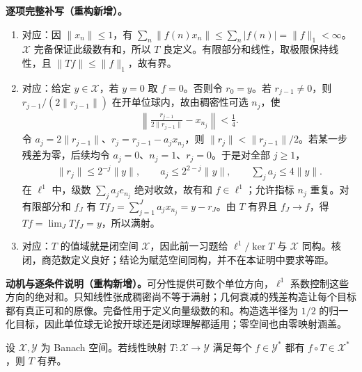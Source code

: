 \documentclass[../../main.tex]{subfiles}
\begin{document}
\begin{solution}
\textbf{逐项完整补写（重构新增）。}
\begin{enumerate}
\item 对应：因 $\|x_n\|\le1$，有 $\sum_n\|f(n)x_n\|\le\sum_n|f(n)|=\|f\|_1<\infty$。$\mathcal X$ 完备保证此级数有和，所以 $T$ 良定义。有限部分和线性，取极限保持线性，且 $\|Tf\|\le\|f\|_1$，故有界。
\item 对应：给定 $y\in\mathcal X$，若 $y=0$ 取 $f=0$。否则令 $r_0=y$。若 $r_{j-1}\ne0$，则 $r_{j-1}/(2\|r_{j-1}\|)$ 在开单位球内，故由稠密性可选 $n_j$，使
\begin{align*}
\left\|\frac{r_{j-1}}{2\|r_{j-1}\|}-x_{n_j}\right\|<\tfrac14.
\end{align*}
令 $a_j=2\|r_{j-1}\|$、$r_j=r_{j-1}-a_jx_{n_j}$，则 $\|r_j\|<\|r_{j-1}\|/2$。若某一步残差为零，后续均令 $a_j=0$、$n_j=1$、$r_j=0$。于是对全部 $j\ge1$，
\begin{align*}
\|r_j\|\le2^{-j}\|y\|,\qquad a_j\le2^{2-j}\|y\|,\qquad \sum_ja_j\le4\|y\|.
\end{align*}
在 $\ell^1$ 中，级数 $\sum_ja_je_{n_j}$ 绝对收敛，故有和 $f\in\ell^1$；允许指标 $n_j$ 重复。对有限部分和 $f_J$ 有 $Tf_J=\sum_{j=1}^Ja_jx_{n_j}=y-r_J$。由 $T$ 有界且 $f_J\to f$，得 $Tf=\lim_JTf_J=y$，所以满射。
\item 对应：$T$ 的值域就是闭空间 $\mathcal X$，因此前一习题给 $\ell^1/\ker T$ 与 $\mathcal X$ 同构。核闭，商范数定义良好；结论为赋范空间同构，并不在本证明中要求等距。
\end{enumerate}
\end{solution}
\begin{remark}
\textbf{动机与逐条件说明（重构新增）。}可分性提供可数个单位方向，$\ell^1$ 系数控制这些方向的绝对和。只知线性张成稠密尚不等于满射；几何衰减的残差构造让每个目标都有真正可和的原像。完备性用于定义向量级数的和。构造选半径为 $1/2$ 的归一化目标，因此单位球无论按开球还是闭球理解都适用；零空间也由零映射涵盖。
\end{remark}
\begin{exercise}\label{exercise:ch05-weak-tests-bounded}
设 $\mathcal X,\mathcal Y$ 为 Banach 空间。若线性映射 $T:\mathcal X\to\mathcal Y$ 满足每个 $f\in\mathcal Y^*$ 都有 $f\circ T\in\mathcal X^*$，则 $T$ 有界。
\end{exercise}
\end{document}
